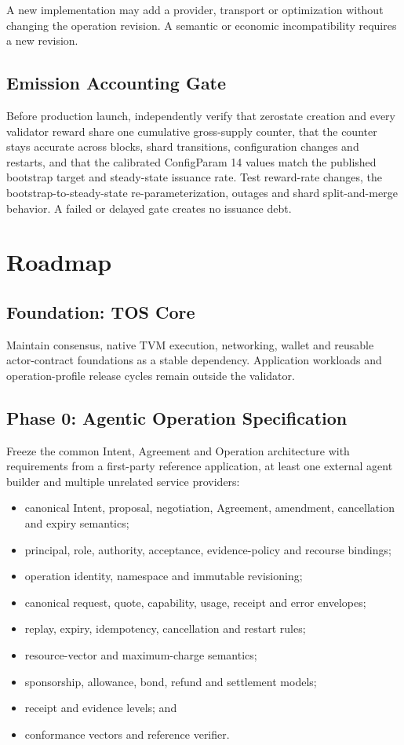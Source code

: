 \documentclass[11pt,oneside]{article}
\begin{document}
A new implementation may add a provider, transport or optimization without changing the
operation revision. A semantic or economic incompatibility requires a new revision.

\subsection{Emission Accounting Gate}

Before production launch, independently verify that zerostate creation and every validator
reward share one cumulative gross-supply counter, that the counter stays accurate across
blocks, shard transitions, configuration changes and restarts, and that the calibrated
ConfigParam 14 values match the published bootstrap target and steady-state issuance rate.
Test reward-rate changes, the bootstrap-to-steady-state re-parameterization, outages and
shard split-and-merge behavior. A failed or delayed gate creates no issuance debt.

\section{Roadmap}

\subsection{Foundation: TOS Core}

Maintain consensus, native TVM execution, networking, wallet and reusable actor-contract
foundations as a stable dependency. Application workloads and operation-profile release
cycles remain outside the validator.

\subsection{Phase 0: Agentic Operation Specification}

Freeze the common Intent, Agreement and Operation architecture with requirements from a first-party reference application,
at least one external agent builder and multiple unrelated service providers:

\begin{itemize}
  \item canonical Intent, proposal, negotiation, Agreement, amendment, cancellation and
        expiry semantics;
  \item principal, role, authority, acceptance, evidence-policy and recourse bindings;
  \item operation identity, namespace and immutable revisioning;
  \item canonical request, quote, capability, usage, receipt and error envelopes;
  \item replay, expiry, idempotency, cancellation and restart rules;
  \item resource-vector and maximum-charge semantics;
  \item sponsorship, allowance, bond, refund and settlement models;
  \item receipt and evidence levels; and
  \item conformance vectors and reference verifier.
\end{itemize}
\end{document}
